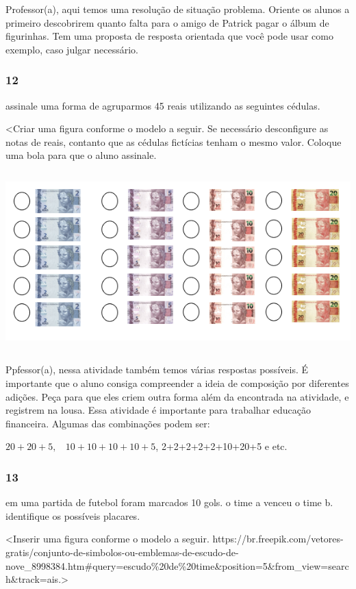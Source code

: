 Professor(a), aqui temos uma resolução de situação problema. Oriente os
alunos a primeiro descobrirem quanto falta para o amigo de Patrick pagar
o álbum de figurinhas. Tem uma proposta de resposta orientada que você
pode usar como exemplo, caso julgar necessário.

\subsubsection{12}\label{section-19}

assinale uma forma de agruparmos 45 reais utilizando as seguintes
cédulas.

\textless{}Criar uma figura conforme o modelo a seguir. Se necessário
desconfigure as notas de reais, contanto que as cédulas fictícias tenham
o mesmo valor. Coloque uma bola para que o aluno assinale.

\includegraphics[width=5.90556in,height=2.71667in]{media/image18.png}

Ppfessor(a), nessa atividade também temos várias respostas possíveis. É
importante que o aluno consiga compreender a ideia de composição por
diferentes adições. Peça para que eles criem outra forma além da
encontrada na atividade, e registrem na lousa. Essa atividade é
importante para trabalhar educação financeira. Algumas das combinações
podem ser:

\(20 + 20 + 5,\ \ \ \ 10 + 10 + 10 + 10 + 5\), 2+2+2+2+2+10+20+5 e etc.

\subsubsection{13}\label{section-20}

em uma partida de futebol foram marcados 10 gols. o time a venceu o time
b. identifique os possíveis placares.

\textless{}Inserir uma figura conforme o modelo a seguir.
https://br.freepik.com/vetores-gratis/conjunto-de-simbolos-ou-emblemas-de-escudo-de-nove\_8998384.htm\#query=escudo\%20de\%20time\&position=5\&from\_view=search\&track=ais.\textgreater{}

